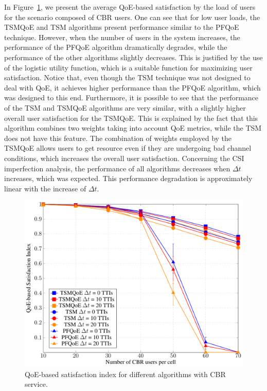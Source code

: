 \documentclass[conference]{IEEEtran}
\newcommand{\FigRef}[1]{Figure~\ref{#1}}
\begin{document}
In \FigRef{Fig:SatisfactionNRT}, we present the average QoE-based satisfaction by the load of users for the scenario composed of CBR users. One can see that for low user loads, the \ac{TSM}QoE and TSM algorithms present performance similar to the \ac{PF}QoE technique. However, when the number of users in the system increases, the performance of the \ac{PF}QoE algorithm dramatically degrades, while the performance of the other algorithms slightly decreases. This is justified by the use of the logistic utility function, which is a suitable function for maximizing user satisfaction. Notice that, even though the TSM technique was not designed to deal with QoE, it achieves higher performance than the PFQoE algorithm, which was designed to this end. Furthermore, it is possible to see that the performance of the TSM and TSMQoE algorithms are very similar, with a slightly higher overall user satisfaction for the TSMQoE. This is explained by the fact that this algorithm combines two weights taking into account QoE metrics, while the TSM does not have this feature. The combination of weights employed by the TSMQoE allows users to get resource even if they are undergoing bad channel conditions, which increases the overall user satisfaction. Concerning the CSI imperfection analysis, the performance of all algorithms decreases when $\Delta t$ increases, which was expected. This performance degradation is approximately linear with the increase of $\Delta t$. 

\begin{figure}[!t]
	\centering
	\includegraphics[width=0.55\linewidth,page=1]{figs_wp2/figs_BRUNO_PEDRO/NRT}
	\caption{QoE-based satisfaction index for different algorithms with \ac{CBR} service.}   
	\label{Fig:SatisfactionNRT}
\end{figure}
\end{document}

